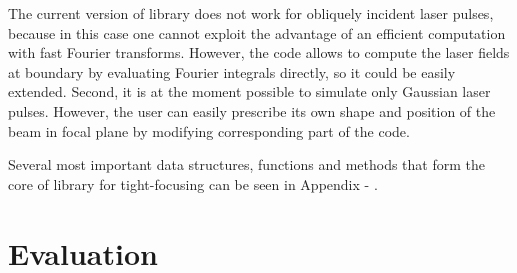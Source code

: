 The current version of library does not work for obliquely incident laser pulses, because in this case one cannot exploit the advantage of an efficient computation with fast Fourier transforms. However, the code allows to compute the laser fields at boundary by evaluating Fourier integrals directly, so it could be easily extended. Second, it is at the moment possible to simulate only Gaussian laser pulses. However, the user can easily prescribe its own shape and position of the beam in focal plane by modifying corresponding part of the code.

Several most important data structures, functions and methods that form the core of library for tight-focusing can be seen in Appendix - .

\section{Evaluation}

